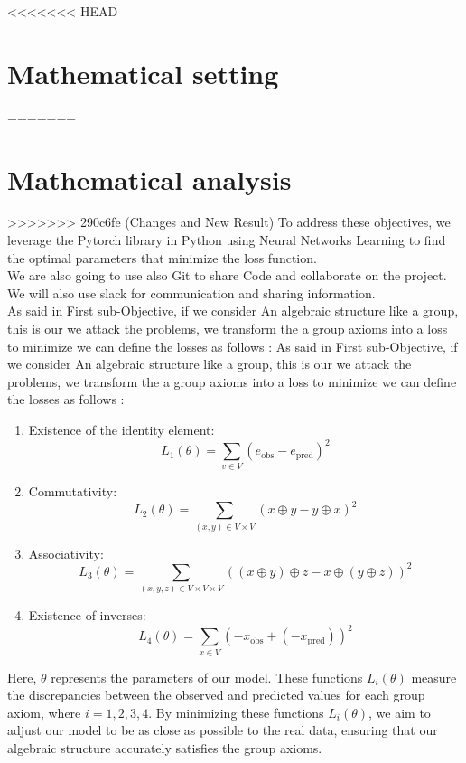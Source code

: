 \documentclass{report}
\begin{document}
        
<<<<<<< HEAD
\section{Mathematical setting}
=======
\section{Mathematical analysis}
>>>>>>> 290c6fe (Changes and New Result)
    To address these objectives, we leverage
    the Pytorch library in Python using Neural Networks Learning to find the optimal parameters that minimize the loss function.\\
    We are also going to use also Git to share Code and collaborate on the project.\\ 
    We will also use slack for communication and sharing information.\\

    As said in  First sub-Objective, if we consider An algebraic structure like a group, this is our we attack the problems, we transform the a group axioms into a loss to minimize we can define the losses as follows : 
    As said in  First sub-Objective, if we consider An algebraic structure like a group, this is our we attack the problems, we transform the a group axioms into a loss to minimize we can define the losses as follows : 

    \begin{enumerate}
        \item Existence of the identity element:  \[
            L_1(\theta) = \sum_{v \in V} (e_{\text{obs}} - e_{\text{pred}})^2
            \]
        \item Commutativity:
        \[
        L_2(\theta) = \sum_{(x, y) \in V \times V} (x \oplus y - y \oplus x)^2
        \]
        \item Associativity:
        \[
        L_3(\theta) = \sum_{(x, y, z) \in V \times V \times V} ((x \oplus y) \oplus z - x \oplus (y \oplus z))^2
        \]
        \item Existence of inverses:
        \[
        L_4(\theta) = \sum_{x \in V} (-x_{\text{obs}} + (-x_{\text{pred}}))^2
        \] 
    \end{enumerate}
    
    Here, $\theta$ represents the parameters of our model.
    These functions $L_i(\theta)$ measure the discrepancies
    between the observed and predicted values for each group 
    axiom, where $i = 1, 2, 3, 4$. By minimizing these functions
    $L_i(\theta)$, we aim to adjust our model to be as close as
    possible to the real data, ensuring that our algebraic 
    structure accurately satisfies the group axioms. 
\end{document}
